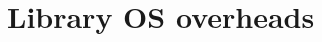 \section{Library OS overheads}
\label{sec:eval:libos}

\makeatletter
{}
\makeatother
\graphicspath{{eval/emu/figures/}}








\makeatletter
{}
\makeatother
\graphicspath{{eval/figures/}}
